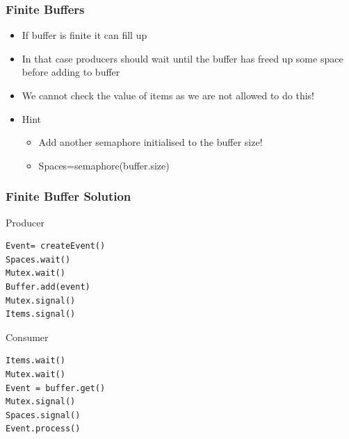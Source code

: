 \documentclass{beamer}
\begin{document}
\begin{frame}[fragile]
	\frametitle{Finite Buffers}
\begin{itemize}
	\item If buffer is finite it can fill up
	\item In that case producers should wait until the buffer has freed up some space before adding to buffer
	\item We cannot check the value of items as we are not allowed to do this!
	\item Hint
		\begin{itemize}
		\item Add another semaphore initialised to the buffer size!
		\item Spaces=semaphore(buffer.size)
		\end{itemize}
\end{itemize}
\end{frame}

\begin{frame}[fragile]
	\frametitle{Finite Buffer Solution}
Producer
	\begin{verbatim}
Event= createEvent()
Spaces.wait()
Mutex.wait()
Buffer.add(event)
Mutex.signal()
Items.signal()
\end{verbatim}
Consumer
		\begin{verbatim}
Items.wait()
Mutex.wait()
Event = buffer.get()
Mutex.signal()
Spaces.signal()
Event.process()
\end{verbatim}
\end{frame}
\end{document}
